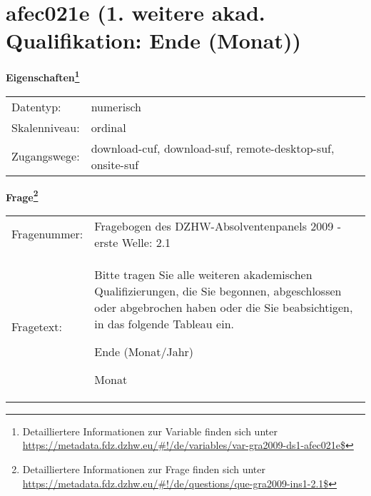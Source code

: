 
    \setcounter{footnote}{0}

    \vspace*{-1.8cm}
	\section{afec021e (1. weitere akad. Qualifikation: Ende (Monat))}
	\label{section:afec021e}



    \vspace*{0.5cm}
    \noindent\textbf{Eigenschaften\footnote{Detailliertere Informationen zur Variable finden sich unter
		\url{https://metadata.fdz.dzhw.eu/\#!/de/variables/var-gra2009-ds1-afec021e$}}}\\
	\begin{tabularx}{\hsize}{@{}lX}
	Datentyp: & numerisch \\
	Skalenniveau: & ordinal \\
	Zugangswege: &
	  download-cuf, 
	  download-suf, 
	  remote-desktop-suf, 
	  onsite-suf
 \\
    \end{tabularx}



				\vspace*{0.5cm}
                \noindent\textbf{Frage\footnote{Detailliertere Informationen zur Frage finden sich unter
		              \url{https://metadata.fdz.dzhw.eu/\#!/de/questions/que-gra2009-ins1-2.1$}}}\\
				\begin{tabularx}{\hsize}{@{}lX}
					Fragenummer: &
					  Fragebogen des DZHW-Absolventenpanels 2009 - erste Welle:
					  2.1
 \\
					Fragetext: & Bitte tragen Sie alle weiteren akademischen Qualifizierungen, die Sie begonnen, abgeschlossen oder abgebrochen haben oder die Sie beabsichtigen, in das folgende Tableau ein.\par  Ende (Monat/Jahr)\par  Monat \\
				\end{tabularx}





